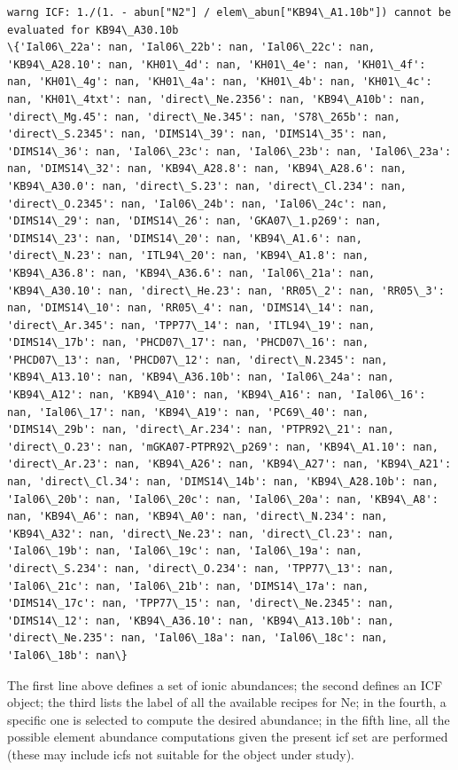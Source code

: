 \documentclass{report}
\begin{document}
    \begin{Verbatim}[commandchars=\\\{\}]
warng ICF: 1./(1. - abun["N2"] / elem\_abun["KB94\_A1.10b"]) cannot be evaluated for KB94\_A30.10b
\{'Ial06\_22a': nan, 'Ial06\_22b': nan, 'Ial06\_22c': nan, 'KB94\_A28.10': nan, 'KH01\_4d': nan, 'KH01\_4e': nan, 'KH01\_4f': nan, 'KH01\_4g': nan, 'KH01\_4a': nan, 'KH01\_4b': nan, 'KH01\_4c': nan, 'KH01\_4txt': nan, 'direct\_Ne.2356': nan, 'KB94\_A10b': nan, 'direct\_Mg.45': nan, 'direct\_Ne.345': nan, 'S78\_265b': nan, 'direct\_S.2345': nan, 'DIMS14\_39': nan, 'DIMS14\_35': nan, 'DIMS14\_36': nan, 'Ial06\_23c': nan, 'Ial06\_23b': nan, 'Ial06\_23a': nan, 'DIMS14\_32': nan, 'KB94\_A28.8': nan, 'KB94\_A28.6': nan, 'KB94\_A30.0': nan, 'direct\_S.23': nan, 'direct\_Cl.234': nan, 'direct\_O.2345': nan, 'Ial06\_24b': nan, 'Ial06\_24c': nan, 'DIMS14\_29': nan, 'DIMS14\_26': nan, 'GKA07\_1.p269': nan, 'DIMS14\_23': nan, 'DIMS14\_20': nan, 'KB94\_A1.6': nan, 'direct\_N.23': nan, 'ITL94\_20': nan, 'KB94\_A1.8': nan, 'KB94\_A36.8': nan, 'KB94\_A36.6': nan, 'Ial06\_21a': nan, 'KB94\_A30.10': nan, 'direct\_He.23': nan, 'RR05\_2': nan, 'RR05\_3': nan, 'DIMS14\_10': nan, 'RR05\_4': nan, 'DIMS14\_14': nan, 'direct\_Ar.345': nan, 'TPP77\_14': nan, 'ITL94\_19': nan, 'DIMS14\_17b': nan, 'PHCD07\_17': nan, 'PHCD07\_16': nan, 'PHCD07\_13': nan, 'PHCD07\_12': nan, 'direct\_N.2345': nan, 'KB94\_A13.10': nan, 'KB94\_A36.10b': nan, 'Ial06\_24a': nan, 'KB94\_A12': nan, 'KB94\_A10': nan, 'KB94\_A16': nan, 'Ial06\_16': nan, 'Ial06\_17': nan, 'KB94\_A19': nan, 'PC69\_40': nan, 'DIMS14\_29b': nan, 'direct\_Ar.234': nan, 'PTPR92\_21': nan, 'direct\_O.23': nan, 'mGKA07-PTPR92\_p269': nan, 'KB94\_A1.10': nan, 'direct\_Ar.23': nan, 'KB94\_A26': nan, 'KB94\_A27': nan, 'KB94\_A21': nan, 'direct\_Cl.34': nan, 'DIMS14\_14b': nan, 'KB94\_A28.10b': nan, 'Ial06\_20b': nan, 'Ial06\_20c': nan, 'Ial06\_20a': nan, 'KB94\_A8': nan, 'KB94\_A6': nan, 'KB94\_A0': nan, 'direct\_N.234': nan, 'KB94\_A32': nan, 'direct\_Ne.23': nan, 'direct\_Cl.23': nan, 'Ial06\_19b': nan, 'Ial06\_19c': nan, 'Ial06\_19a': nan, 'direct\_S.234': nan, 'direct\_O.234': nan, 'TPP77\_13': nan, 'Ial06\_21c': nan, 'Ial06\_21b': nan, 'DIMS14\_17a': nan, 'DIMS14\_17c': nan, 'TPP77\_15': nan, 'direct\_Ne.2345': nan, 'DIMS14\_12': nan, 'KB94\_A36.10': nan, 'KB94\_A13.10b': nan, 'direct\_Ne.235': nan, 'Ial06\_18a': nan, 'Ial06\_18c': nan, 'Ial06\_18b': nan\}

    \end{Verbatim}

The first line above defines a set of ionic abundances; the second
defines an ICF object; the third lists the label of all the available
recipes for Ne; in the fourth, a specific one is selected to compute the
desired abundance; in the fifth line, all the possible element abundance
computations given the present icf set are performed (these may include
icfs not suitable for the object under study).
\end{document}
